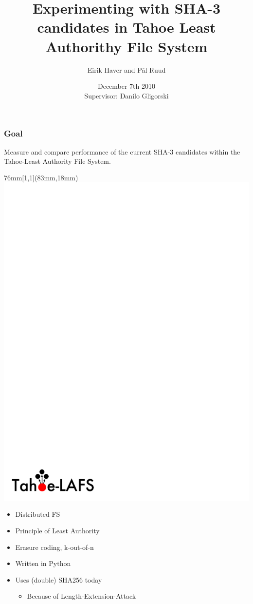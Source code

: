 \documentclass[screen]{beamer}
\title[SHA-3 in Tahoe-LAFS]%
{Experimenting with SHA-3 candidates in Tahoe Least Authorithy File System}
\author[EH \& PR]{Eirik Haver and Pål Ruud}
\institute[NTNU]{Department of Telematics}
\date{December 7th 2010\\ \vspace{12pt} Supervisor: Danilo Gligorski}
\begin{document}
\ntnutitlepage

\begin{frame}
  \frametitle{Goal}

  Measure and compare performance of the current SHA-3 candidates within the
  Tahoe-Least Authority File System.

\end{frame}

\begin{frame}
  \begin{textblock*}{76mm}[1,1](83mm,18mm)
  \includegraphics[scale=0.4]{tahoe-logo.pdf}
  \end{textblock*}

  \begin{itemize}
  \item Distributed FS
  \item Principle of Least Authority
  \item Erasure coding, k-out-of-n
  \item Written in Python
  \item Uses (double) SHA256 today
    \begin{itemize}
        \item Because of Length-Extension-Attack
    \end{itemize}
  \end{itemize}
\end{frame}
\end{document}
